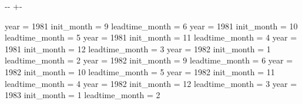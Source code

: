\documentclass[letterpaper,10pt,english]{sphinxmanual}
\newlength\nbsphinxcodecellspacing
\begin{document}
{
\begin{sphinxVerbatim}[commandchars=\\\{\}]
\llap{\color{nbsphinxin}[101]:\,\hspace{\fboxrule}\hspace{\fboxsep}}
   
       
          \PYG{p}{[}\PYG{p}{]}
          
           
              \PYG{p}{[}\PYG{p}{]}
              \PYG{p}{[}\PYG{p}{]}
                  
\end{sphinxVerbatim}
}

{

\kern-\sphinxverbatimsmallskipamount\kern-\baselineskip
\kern+\FrameHeightAdjust\kern-\fboxrule
\vspace{\nbsphinxcodecellspacing}

\begin{sphinxVerbatim}[commandchars=\\\{\}]
year = 1981 init\_month = 9 leadtime\_month = 6
year = 1981 init\_month = 10 leadtime\_month = 5
year = 1981 init\_month = 11 leadtime\_month = 4
year = 1981 init\_month = 12 leadtime\_month = 3
year = 1982 init\_month = 1 leadtime\_month = 2
year = 1982 init\_month = 9 leadtime\_month = 6
year = 1982 init\_month = 10 leadtime\_month = 5
year = 1982 init\_month = 11 leadtime\_month = 4
year = 1982 init\_month = 12 leadtime\_month = 3
year = 1983 init\_month = 1 leadtime\_month = 2
\end{sphinxVerbatim}
}
\end{document}
